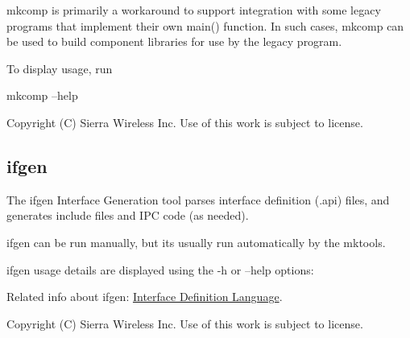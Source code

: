 {\ttfamily mkcomp} is primarily a workaround to support integration with some legacy programs that implement their own {\ttfamily main()} function. In such cases, {\ttfamily mkcomp} can be used to build component libraries for use by the legacy program.

To display usage, run \begin{DoxyVerb}mkcomp --help\end{DoxyVerb}






Copyright (C) Sierra Wireless Inc. Use of this work is subject to license. \hypertarget{buildToolsifgen}{}\subsection{ifgen}\label{buildToolsifgen}
The {\ttfamily ifgen} Interface Generation tool parses interface definition ({\ttfamily .api}) files, and generates include files and I\+P\+C code (as needed).

{\ttfamily ifgen} can be run manually, but it\textquotesingle{}s usually run automatically by the {\ttfamily mktools}.

{\ttfamily ifgen} usage details are displayed using the {\ttfamily -\/h} or {\ttfamily --help} options\+:

Related info about ifgen\+: \hyperlink{interfaceDefLang}{Interface Definition Language}.





Copyright (C) Sierra Wireless Inc. Use of this work is subject to license. 